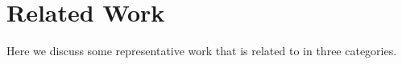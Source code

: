 \section{Related Work}



Here we discuss some representative work that is related to \name in three categories.

